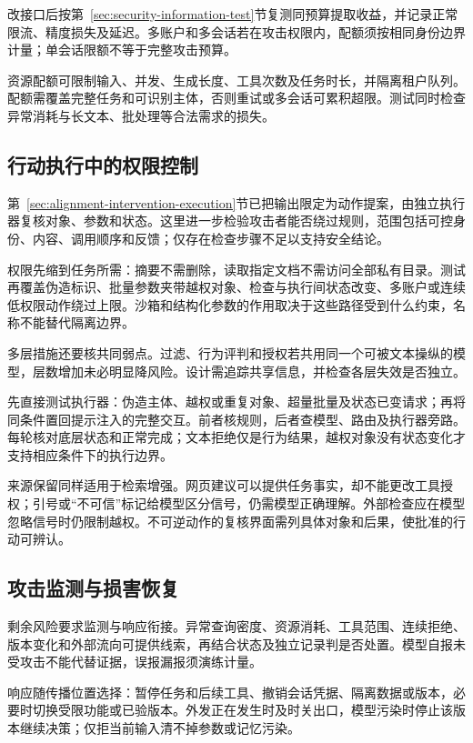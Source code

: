 改接口后按第~\ref{sec:security-information-test}节复测同预算提取收益，并记录正常限流、精度损失及延迟。多账户和多会话若在攻击权限内，配额须按相同身份边界计量；单会话限额不等于完整攻击预算。

资源配额可限制输入、并发、生成长度、工具次数及任务时长，并隔离租户队列。配额需覆盖完整任务和可识别主体，否则重试或多会话可累积超限。测试同时检查异常消耗与长文本、批处理等合法需求的损失。

\subsection{行动执行中的权限控制}
\label{sec:security-execution-defense}

第~\ref{sec:alignment-intervention-execution}节已把输出限定为动作提案，由独立执行器复核对象、参数和状态。这里进一步检验攻击者能否绕过规则，范围包括可控身份、内容、调用顺序和反馈；仅存在检查步骤不足以支持安全结论。

权限先缩到任务所需：摘要不需删除，读取指定文档不需访问全部私有目录。测试再覆盖伪造标识、批量参数夹带越权对象、检查与执行间状态改变、多账户或连续低权限动作绕过上限。沙箱和结构化参数的作用取决于这些路径受到什么约束，名称不能替代隔离边界。

多层措施还要核共同弱点。过滤、行为评判和授权若共用同一个可被文本操纵的模型，层数增加未必明显降风险。设计需追踪共享信息，并检查各层失效是否独立。

先直接测试执行器：伪造主体、越权或重复对象、超量批量及状态已变请求；再将同条件置回提示注入的完整交互。前者核规则，后者查模型、路由及执行器旁路。每轮核对底层状态和正常完成；文本拒绝仅是行为结果，越权对象没有状态变化才支持相应条件下的执行边界。

来源保留同样适用于检索增强。网页建议可以提供任务事实，却不能更改工具授权；引号或“不可信”标记给模型区分信号，仍需模型正确理解。外部检查应在模型忽略信号时仍限制越权。不可逆动作的复核界面需列具体对象和后果，使批准的行动可辨认。

\subsection{攻击监测与损害恢复}
\label{sec:security-recovery}

剩余风险要求监测与响应衔接。异常查询密度、资源消耗、工具范围、连续拒绝、版本变化和外部流向可提供线索，再结合状态及独立记录判是否处置。模型自报未受攻击不能代替证据，误报漏报须演练计量。

响应随传播位置选择：暂停任务和后续工具、撤销会话凭据、隔离数据或版本，必要时切换受限功能或已验版本。外发正在发生时及时关出口，模型污染时停止该版本继续决策；仅拒当前输入清不掉参数或记忆污染。


